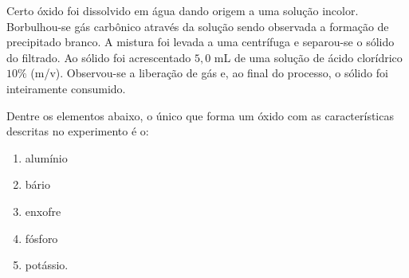 Certo óxido foi dissolvido em água dando origem a uma solução incolor. Borbulhou-se gás carbônico através da solução sendo observada a formação de precipitado branco.
A mistura foi levada a uma centrífuga e separou-se o sólido do filtrado.
Ao sólido foi acrescentado $5,0$ mL de uma solução de ácido clorídrico $10\%$ (m/v).
Observou-se a liberação de gás e, ao final do processo, o sólido foi inteiramente consumido.

Dentre os elementos abaixo, o único que forma um óxido com as características descritas no experimento é o:

\begin{enumerate}[label = (\alph*), itemjoin={\qquad}]
	\item alumínio
	\item bário
	\item enxofre
	\item fósforo
	\item potássio.
\end{enumerate}
